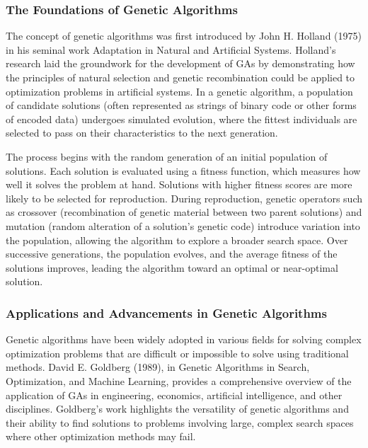 \documentclass[12pt,twoside]{article}
\begin{document}
\subsubsection{The Foundations of Genetic Algorithms}

The concept of genetic algorithms was first introduced by John H. Holland (1975) in his seminal work Adaptation in Natural and Artificial Systems. Holland’s research laid the groundwork for the development of GAs by demonstrating how the principles of natural selection and genetic recombination could be applied to optimization problems in artificial systems. In a genetic algorithm, a population of candidate solutions (often represented as strings of binary code or other forms of encoded data) undergoes simulated evolution, where the fittest individuals are selected to pass on their characteristics to the next generation.

The process begins with the random generation of an initial population of solutions. Each solution is evaluated using a fitness function, which measures how well it solves the problem at hand. Solutions with higher fitness scores are more likely to be selected for reproduction. During reproduction, genetic operators such as crossover (recombination of genetic material between two parent solutions) and mutation (random alteration of a solution’s genetic code) introduce variation into the population, allowing the algorithm to explore a broader search space. Over successive generations, the population evolves, and the average fitness of the solutions improves, leading the algorithm toward an optimal or near-optimal solution.

\subsubsection{Applications and Advancements in Genetic Algorithms}

Genetic algorithms have been widely adopted in various fields for solving complex optimization problems that are difficult or impossible to solve using traditional methods. David E. Goldberg (1989), in Genetic Algorithms in Search, Optimization, and Machine Learning, provides a comprehensive overview of the application of GAs in engineering, economics, artificial intelligence, and other disciplines. Goldberg’s work highlights the versatility of genetic algorithms and their ability to find solutions to problems involving large, complex search spaces where other optimization methods may fail.
\end{document}
